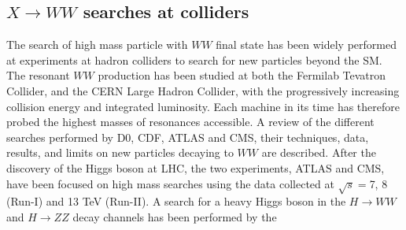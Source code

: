 \subsection*{$X \to WW$ searches at colliders}
The search of high mass particle with  $WW$ final state  has been widely performed at experiments at hadron
colliders to search for new particles beyond the SM. 
The resonant $WW$ production has been studied at both the Fermilab Tevatron Collider, and the CERN Large
Hadron Collider, with the progressively increasing collision energy and integrated
luminosity. Each machine in its time has therefore probed the highest masses of
 resonances accessible. A review of the different searches
performed by D0, CDF, ATLAS and CMS, their techniques, data, results, and
limits on new particles decaying to $WW$ are described. 
After the discovery of the Higgs boson at LHC, the two experiments, ATLAS and CMS, have been focused on high mass searches using the data collected at $\sqrt{s}=$7, 8 (Run-I) and 13 TeV (Run-II). A search for a heavy Higgs boson in the $H \to WW$ and $H \to ZZ$ decay channels has been performed by the
